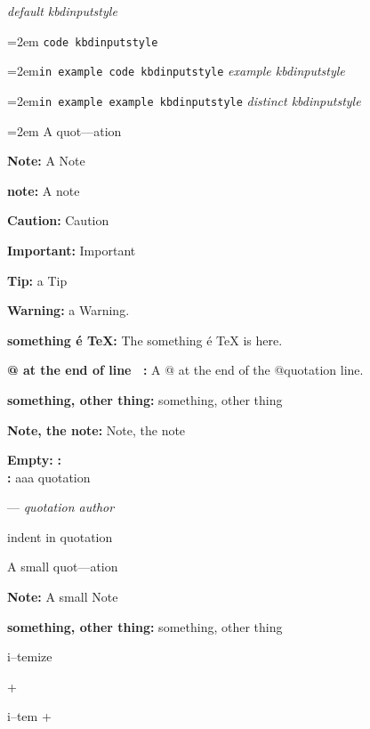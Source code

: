 \documentclass{book}
\begin{document}
{\ttfamily\textsl{default kbdinputstyle}}
\par\begingroup\obeylines\obeyspaces\frenchspacing\leftskip=2em\relax\parskip=0pt\relax{}
\endgroup{}
\texttt{code kbdinputstyle}
\par\begingroup\obeylines\obeyspaces\frenchspacing\leftskip=2em\relax\parskip=0pt\relax\ttfamily{}\texttt{in example code kbdinputstyle}
\endgroup{}
{\ttfamily\textsl{example kbdinputstyle}}
\par\begingroup\obeylines\obeyspaces\frenchspacing\leftskip=2em\relax\parskip=0pt\relax\ttfamily{}\texttt{in example example kbdinputstyle}
\endgroup{}
{\ttfamily\textsl{distinct kbdinputstyle}}
\par\begingroup\obeylines\obeyspaces\frenchspacing\leftskip=2em\relax\parskip=0pt\relax{}
\endgroup{}
A quot---ation

\textbf{Note:} A Note

\textbf{note:} A note

\textbf{Caution:} Caution

\textbf{Important:} Important

\textbf{Tip:} a Tip

\textbf{Warning:} a Warning.

\textbf{something \'{e} \TeX{}:} The something \'{e} \TeX{} is here.

\textbf{@ at the end of line \ {}:} A @ at the end of the @quotation line.

\textbf{something, other thing:} something, other thing

\textbf{Note, the note:} Note, the note


\textbf{Empty:} 
\textbf{:} 
\textbf{\leavevmode{}\\:} 
aaa quotation
\begin{center}
--- \emph{quotation author}
\end{center}

indent in quotation

A small quot---ation

\textbf{Note:} A small Note

\textbf{something, other thing:} something, other thing

\textbullet{} 

i--temize

+ 

i--tem +

\textbullet{} 
\end{document}
